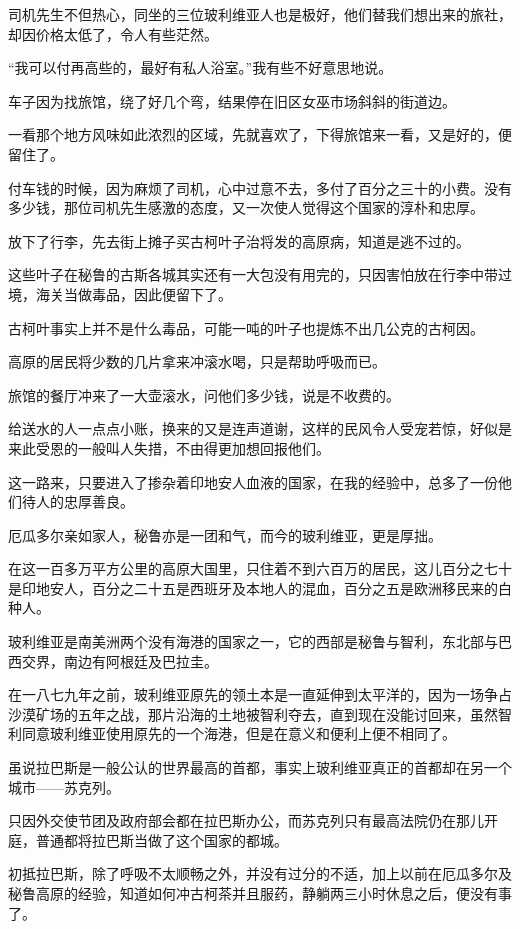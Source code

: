 \par 司机先生不但热心，同坐的三位玻利维亚人也是极好，他们替我们想出来的旅社，却因价格太低了，令人有些茫然。
\par “我可以付再高些的，最好有私人浴室。”我有些不好意思地说。
\par 车子因为找旅馆，绕了好几个弯，结果停在旧区女巫市场斜斜的街道边。
\par 一看那个地方风味如此浓烈的区域，先就喜欢了，下得旅馆来一看，又是好的，便留住了。
\par 付车钱的时候，因为麻烦了司机，心中过意不去，多付了百分之三十的小费。没有多少钱，那位司机先生感激的态度，又一次使人觉得这个国家的淳朴和忠厚。
\par 放下了行李，先去街上摊子买古柯叶子治将发的高原病，知道是逃不过的。
\par 这些叶子在秘鲁的古斯各城其实还有一大包没有用完的，只因害怕放在行李中带过境，海关当做毒品，因此便留下了。
\par 古柯叶事实上并不是什么毒品，可能一吨的叶子也提炼不出几公克的古柯因。
\par 高原的居民将少数的几片拿来冲滚水喝，只是帮助呼吸而已。
\par 旅馆的餐厅冲来了一大壶滚水，问他们多少钱，说是不收费的。
\par 给送水的人一点点小账，换来的又是连声道谢，这样的民风令人受宠若惊，好似是来此受恩的一般叫人失措，不由得更加想回报他们。
\par 这一路来，只要进入了掺杂着印地安人血液的国家，在我的经验中，总多了一份他们待人的忠厚善良。
\par 厄瓜多尔亲如家人，秘鲁亦是一团和气，而今的玻利维亚，更是厚拙。
\par 在这一百多万平方公里的高原大国里，只住着不到六百万的居民，这儿百分之七十是印地安人，百分之二十五是西班牙及本地人的混血，百分之五是欧洲移民来的白种人。
\par 玻利维亚是南美洲两个没有海港的国家之一，它的西部是秘鲁与智利，东北部与巴西交界，南边有阿根廷及巴拉圭。
\par 在一八七九年之前，玻利维亚原先的领土本是一直延伸到太平洋的，因为一场争占沙漠矿场的五年之战，那片沿海的土地被智利夺去，直到现在没能讨回来，虽然智利同意玻利维亚使用原先的一个海港，但是在意义和便利上便不相同了。
\par 虽说拉巴斯是一般公认的世界最高的首都，事实上玻利维亚真正的首都却在另一个城市——苏克列。
\par 只因外交使节团及政府部会都在拉巴斯办公，而苏克列只有最高法院仍在那儿开庭，普通都将拉巴斯当做了这个国家的都城。
\par 初抵拉巴斯，除了呼吸不太顺畅之外，并没有过分的不适，加上以前在厄瓜多尔及秘鲁高原的经验，知道如何冲古柯茶并且服药，静躺两三小时休息之后，便没有事了。
